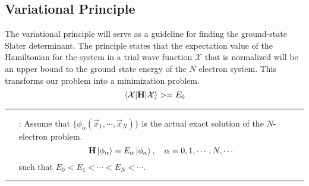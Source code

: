 \documentclass[12pt,a4paper,titlepage]{article}
\newcommand{\aside}[2]{ %
	\bigskip
	{\color{gray}\hrule}
	\bigskip
	\begin{itemize}[align=left,labelindent=0em,labelwidth=3em,labelsep*=0.5em,leftmargin=!]
		\item[\ul{#1}:]{#2}
	\end{itemize}
	\bigskip
	{\color{gray}\hrule}
	\bigskip
}
\newcommand{\ul}[1]{\underline{\smash{#1}}} %
\newcommand{\Chi}{\mathcal{X}} %
\begin{document}
\subsection{Variational Principle}
The variational principle will serve as a guideline for finding the ground-state Slater determinant. The principle states that the expectation value of the Hamiltonian for the system in a trial wave function $\Chi$ that is normalized will be an upper bound to the ground state energy of the $N$ electron system. This transforms our problem into a minimization problem.
\begin{equation}
\mel{\Chi}{\vb{H}}{\Chi}>=E_{0}
\end{equation}
\aside{Proof}{Assume that $\{\phi_{\alpha}(\vec{x}_{1},\cdots,\vec{x}_{N})\}$ is the actual exact solution of the $N$-electron problem.
\begin{equation}
\vb{H}\ket{\phi_{\alpha}}=E_{\alpha}\ket{\phi_{\alpha}},\quad\alpha=0,1,\cdots,N,\cdots
\end{equation}
such that $E_{0}<E_{1}<\cdots<E_{N}<\cdots$.\\

}
\end{document}
